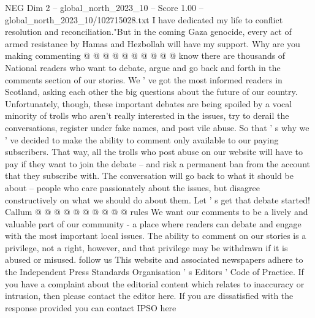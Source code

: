 \begin{textsample}{NEG Dim 2 – global\_north\_2023\_10 – Score 1.00 – global\_north\_2023\_10/102715028.txt}
I have dedicated my life to conflict resolution and reconciliation."But in the coming Gaza genocide, every act of armed resistance by Hamas and Hezbollah will have my support.
Why are you making commenting @ @ @ @ @ @ @ @ @ @ know there are thousands of National readers who want to debate, argue and go back and forth in the comments section of our stories.
We ' ve got the most informed readers in Scotland, asking each other the big questions about the future of our country.
Unfortunately, though, these important debates are being spoiled by a vocal minority of trolls who aren't really interested in the issues, try to derail the conversations, register under fake names, and post vile abuse.
So that ' s why we ' ve decided to make the ability to comment only available to our paying subscribers.
That way, all the trolls who post abuse on our website will have to pay if they want to join the debate -- and risk a permanent ban from the account that they subscribe with.
The conversation will go back to what it should be about -- people who care passionately about the issues, but disagree constructively on what we should do about them.
Let ' s get that debate started!
Callum @ @ @ @ @ @ @ @ @ @ rules We want our comments to be a lively and valuable part of our community - a place where readers can debate and engage with the most important local issues.
The ability to comment on our stories is a privilege, not a right, however, and that privilege may be withdrawn if it is abused or misused. follow us This website and associated newspapers adhere to the Independent Press Standards Organisation ' s Editors ' Code of Practice.
If you have a complaint about the editorial content which relates to inaccuracy or intrusion, then please contact the editor here.
If you are dissatisfied with the response provided you can contact IPSO here

\end{textsample}
